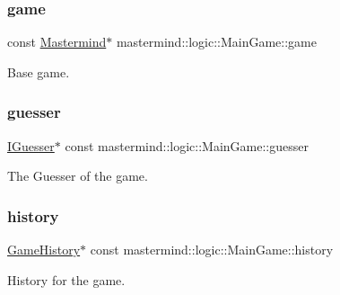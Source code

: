 \subsubsection{\texorpdfstring{game}{game}}
{\footnotesize\ttfamily const \hyperlink{classmastermind_1_1logic_1_1_mastermind}{Mastermind}$\ast$ mastermind\+::logic\+::\+Main\+Game\+::game\hspace{0.3cm}{\ttfamily [private]}}



Base game. 

\hypertarget{classmastermind_1_1logic_1_1_main_game_aacb345c4a133339f2680837ad256fa19}{}\label{classmastermind_1_1logic_1_1_main_game_aacb345c4a133339f2680837ad256fa19} 
\subsubsection{\texorpdfstring{guesser}{guesser}}
{\footnotesize\ttfamily \hyperlink{classmastermind_1_1logic_1_1_i_guesser}{I\+Guesser}$\ast$ const mastermind\+::logic\+::\+Main\+Game\+::guesser\hspace{0.3cm}{\ttfamily [private]}}



The Guesser of the game. 

\hypertarget{classmastermind_1_1logic_1_1_main_game_a6620d1b001a306b469f9d5e88d540f0c}{}\label{classmastermind_1_1logic_1_1_main_game_a6620d1b001a306b469f9d5e88d540f0c} 
\subsubsection{\texorpdfstring{history}{history}}
{\footnotesize\ttfamily \hyperlink{classmastermind_1_1logic_1_1_game_history}{Game\+History}$\ast$ const mastermind\+::logic\+::\+Main\+Game\+::history\hspace{0.3cm}{\ttfamily [private]}}



History for the game. 

\hypertarget{classmastermind_1_1logic_1_1_main_game_a9fff568bdb033edbfed54d3c4bc58ef3}{}\label{classmastermind_1_1logic_1_1_main_game_a9fff568bdb033edbfed54d3c4bc58ef3} 
